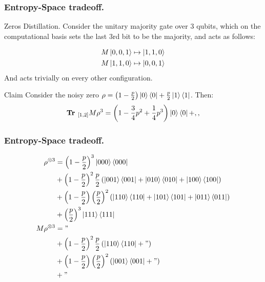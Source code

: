 \documentclass{beamer}
\begin{document}
\begin{frame}
  \frametitle{Entropy-Space tradeoff.}

Zeros Distillation. Consider the unitary majority gate over $3$ qubits, which on the computational basis sets the last $3$rd bit to be the majority, and acts as follows:
  
  \begin{equation*}
    \begin{split}
      M \ket{0,0,1} & \mapsto \ket{1,1,0} \\ 
      M \ket{1,1,0} & \mapsto \ket{0,0,1} \\ 
    \end{split}
  \end{equation*} 
And acts trivially on every other configuration.

\begin{block}{Claim} Consider the noisy zero $\rho = \left( 1 - \frac{p}{2} \right) \ket{0}\bra{0} + \frac{p}{2}\ket{1}\bra{1}$. Then: 
  \begin{equation*}
    \begin{split}
      \textbf{Tr }_{[1,2]} M \rho^{3} = \left( 1 - \frac{3}{4}p^2 + \frac{1}{4}p^{3} \right) \ket{0}\bra{0} + ,,
    \end{split}
  \end{equation*}
\end{block}
\end{frame}
\begin{frame}
  \frametitle{Entropy-Space tradeoff.}

  
  \begin{equation*}
    \begin{split}
      \rho^{\otimes 3} &= \left( 1 - \frac{p}{2} \right)^3 \ket{000}\bra{000} \\ 
      &+ \left( 1 - \frac{p}{2} \right)^{2} \frac{p}{2}\left( \ket{001}\bra{001} + \ket{010}\bra{010} + \ket{100}\bra{100}  \right) \\
      &+ \left( 1 - \frac{p}{2} \right)\left(\frac{p}{2}\right)^2 \left( \ket{110}\bra{110} + \ket{101}\bra{101} + \ket{011}\bra{011} \right) \\ 
      &+ \left( \frac{p}{2} \right)^{3} \ket{111}\bra{111}\\
      M\rho^{\otimes 3} &= " \\
      &+ \left( 1 - \frac{p}{2} \right)^{2} \frac{p}{2}\left( \ket{110}\bra{110} + "  \right) \\
      &+ \left( 1 - \frac{p}{2} \right)\left(\frac{p}{2}\right)^2 \left( \ket{001}\bra{001} + " \right) \\ 
      &+ " 
    \end{split}
  \end{equation*}
\end{frame}
\end{document}
